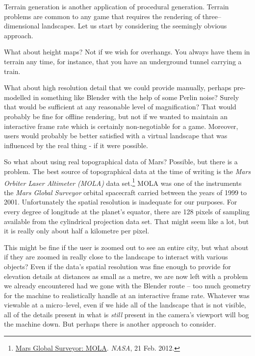 Terrain generation is another application of procedural generation. Terrain problems are common to any game that requires the rendering of three--dimensional landscapes. Let us start by considering the seemingly obvious approach.

What about height maps? Not if we wish for overhangs. You always have them in terrain any time, for instance, that you have an underground tunnel carrying a train.

What about high resolution detail that we could provide manually, perhaps pre-modelled in something like Blender with the help of some Perlin noise? Surely that would be sufficient at any reasonable level of magnification? That would probably be fine for offline rendering, but not if we wanted to maintain an interactive frame rate which is certainly non-negotiable for a game. Moreover, users would probably be better satisfied with a virtual landscape that was influenced by the real thing - if it were possible.

So what about using real topographical data of Mars? Possible, but there is a problem. The best source of topographical data at the time of writing is the {\it Mars Orbiter Laser Altimeter (MOLA)} data set.\footnote{\href{http://pds-geosciences.wustl.edu/missions/mgs/mola.html}{Mars Global Surveyor: MOLA}. {\it NASA}, 21 Feb. 2012.} MOLA was one of the instruments the {\it Mars Global Surveyor} orbital spacecraft carried between the years of 1999 to 2001. Unfortunately the spatial resolution is inadequate for our purposes. For every degree of longitude at the planet's equator, there are 128 pixels of sampling available from the cylindrical projection data set. That might seem like a lot, but it is really only about half a kilometre per pixel.

This might be fine if the user is zoomed out to see an entire city, but what about if they are zoomed in really close to the landscape to interact with various objects? Even if the data's spatial resolution was fine enough to provide for elevation details at distances as small as a metre, we are now left with a problem we already encountered had we gone with the Blender route -- too much geometry for the machine to realistically handle at an interactive frame rate. Whatever was viewable at a micro--level, even if we hide all of the landscape that is not visible, all of the details present in what is {\it still} present in the camera's viewport will bog the machine down. But perhaps there is another approach to consider.

